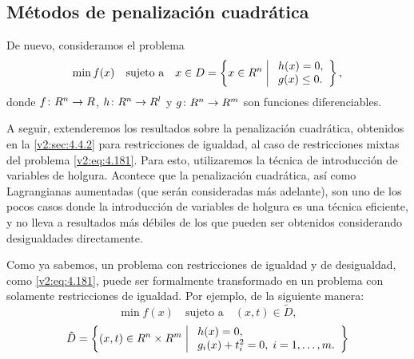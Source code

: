 
\subsection{Métodos de penalización cuadrática}\label{v2:sec:4.5.3}

De nuevo, consideramos el problema
\begin{equation}
    \min f(x) \quad \text{sujeto a} \quad x \in D = \left\{ x \in R^n \;\middle|\; \begin{array}{l} h(x) = 0, \\ g(x) \le 0. \end{array} \right\},
    \label{v2:eq:4.181}
\end{equation}
donde $f \colon R^n \to R$, $h \colon R^n \to R^l$ y $g \colon R^n \to R^m$ son funciones diferenciables.

A seguir, extenderemos los resultados sobre la penalización cuadrática, obtenidos en la \cref{v2:sec:4.4.2} para restricciones de igualdad, al caso de restricciones mixtas del problema \eqref{v2:eq:4.181}. Para esto, utilizaremos la técnica de introducción de variables de holgura. Acontece que la penalización cuadrática, así como Lagrangianas aumentadas (que serán consideradas más adelante), son uno de los pocos casos donde la introducción de variables de holgura es una técnica eficiente, y no lleva a resultados más débiles de los que pueden ser obtenidos considerando desigualdades directamente.

Como ya sabemos, un problema con restricciones de igualdad y de desigualdad, como \eqref{v2:eq:4.181}, puede ser formalmente transformado en un problema con solamente restricciones de igualdad. Por ejemplo, de la siguiente manera:
\begin{equation}
    \min f(x) \quad \text{sujeto a} \quad (x, t) \in \tilde{D},
    \label{v2:eq:4.182}
\end{equation}
\begin{equation}
    \tilde{D} = \left\{ (x, t) \in R^n \times R^m \;\middle|\; \begin{array}{l} h(x) = 0, \\ g_i(x) + t_i^2 = 0, \; i = 1, \dots, m. \end{array} \right\}
    \label{v2:eq:4.183}
\end{equation}


